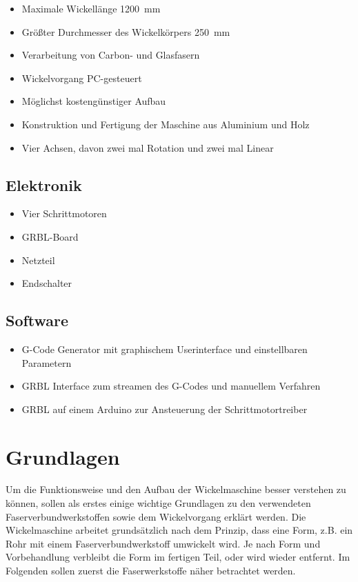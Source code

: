 \documentclass[paper=A4,pagesize,DIV=18, 12pt,listof=totoc,bibliography=totoc,headings=optiontohead,open=any]{article}
\begin{document}
\begin{itemize}
    \item Maximale Wickellänge \SI{1200}{\milli\metre}
    \item Größter Durchmesser des Wickelkörpers \SI{250}{\milli\metre}
    \item Verarbeitung von Carbon- und Glasfasern
    \item Wickelvorgang PC-gesteuert
    \item Möglichst kostengünstiger Aufbau
    \item Konstruktion und Fertigung der Maschine aus Aluminium und Holz
    \item Vier Achsen, davon zwei mal Rotation und zwei mal Linear
\end{itemize}

\subsection{Elektronik}
\begin{itemize}
    \item Vier Schrittmotoren
    \item GRBL-Board 
    \item Netzteil
    \item Endschalter
\end{itemize}


\subsection{Software}
\begin{itemize}
    \item G-Code Generator mit graphischem Userinterface und einstellbaren Parametern
    \item GRBL Interface zum streamen des G-Codes und manuellem Verfahren
    \item GRBL auf einem Arduino zur Ansteuerung der Schrittmotortreiber
\end{itemize}

\section{Grundlagen}
Um die Funktionsweise und den Aufbau der Wickelmaschine besser verstehen zu können, sollen als erstes einige wichtige Grundlagen zu den verwendeten Faserverbundwerkstoffen sowie dem Wickelvorgang erklärt werden. Die Wickelmaschine arbeitet grundsätzlich nach dem Prinzip, dass eine Form, z.B. ein Rohr mit einem Faserverbundwerkstoff umwickelt wird. Je nach Form und Vorbehandlung verbleibt die Form im fertigen Teil, oder wird wieder entfernt. Im Folgenden sollen zuerst die Faserwerkstoffe näher betrachtet werden.
\end{document}
